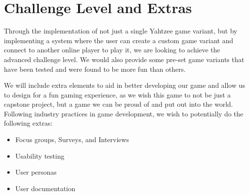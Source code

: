 \documentclass{article}
\begin{document}
\section{Challenge Level and Extras}

\iffalse
\wss{State your expected challenge level (advanced, general or basic).  The
challenge can come through the required domain knowledge, the implementation or
something else.  Usually the greater the novelty of a project the greater its
challenge level.  You should include your rationale for the selected level.
Approval of the level will be part of the discussion with the instructor for
approving the project.  The challenge level, with the approval (or request) of
the instructor, can be modified over the course of the term.}

\wss{Teams may wish to include extras as either potential bonus grades, or to
make up for a less advanced challenge level.  Potential extras include usability
testing, code walkthroughs, user documentation, formal proof, GenderMag
personas, Design Thinking, etc.  Normally the maximum number of extras will be
two.  Approval of the extras will be part of the discussion with the instructor
for approving the project.  The extras, with the approval (or request) of the
instructor, can be modified over the course of the term.}
\fi

Through the implementation of not just a single Yahtzee game variant, but by implementing a system where the user can create a custom game variant and connect to another online player to play it, we are looking to achieve the advanced challenge level. We would also provide some pre-set game variants that have been tested and were found to be more fun than others.

We will include extra elements to aid in better developing our game and allow us to design for a fun gaming experience, as we wish this game to not be just a capstone project, but a game we can be proud of and put out into the world. Following industry practices in game development, we wish to potentially do the following extras:

\begin{itemize}
	\item Focus groups, Surveys, and Interviews
	\item Usability testing
	\item User personas
	\item User documentation
\end{itemize}

\newpage{}
\end{document}

